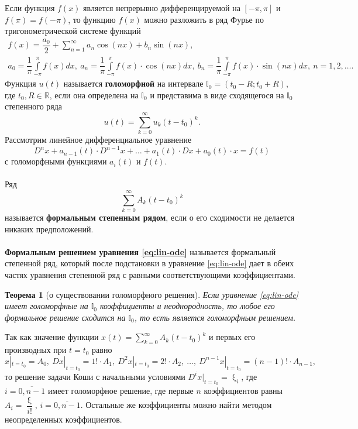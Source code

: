 \documentclass[a4paper, 12pt]{report}
\numberwithin{equation}{section}
\renewcommand{\xi}{\upxi}
\newtheorem*{theorem}{Теорема}
\begin{document}
	Если функция $f(x)$ является непрерывно дифференцируемой на $[-\pi, \pi]$ и $f(\pi) = f(-\pi)$, то функцию $f(x)$ можно разложить в ряд Фурье по тригонометрической системе функций
	\begin{equation*}
		\begin{gathered}
			f(x) = \dfrac{a_0}{2} + \sum_{n=1}^\infty a_n \cos (nx) + b_n \sin (nx),\\
			a_0 = \dfrac 1 \pi \int\limits_{-\pi}^\pi f(x)dx,\ a_n = \dfrac 1 \pi \int\limits_{-\pi}^\pi f(x)\cdot \cos(nx)dx,\ b_n = \dfrac 1 \pi \int\limits_{-\pi}^\pi f(x)\cdot \sin(nx)dx,\ n=1,2,\ldots.
		\end{gathered}
	\end{equation*}
	Функция $u(t)$ называется \textbf{голоморфной} на интервале $\mathbb I_0 = (t_0 - R; t_0 + R)$, где $t_0, R \in \mathbb R$, если она определена на $\mathbb I_0$ и представима в виде сходящегося на $\mathbb I_0$ степенного ряда $$u(t) = \sum\limits_{k=0}^\infty u_k (t-t_0)^k.$$ 
	Рассмотрим линейное дифференциальное уравнение 
	\begin{equation}
		\label{eq:lin-ode}
		D^nx + a_{n-1}(t)\cdot D^{n-1}x + \ldots + a_1(t)\cdot Dx + a_0(t)\cdot x = f(t)
	\end{equation} с голоморфными функциями $a_i(t)$ и $f(t)$.\\\\
	Ряд $$\sum_{k=0}^\infty A_k(t-t_0)^k$$ называется \textbf{формальным степенным рядом}, если о его сходимости не делается никаких предположений.\\\\
	\textbf{Формальным решением уравнения \eqref{eq:lin-ode}} называется формальный степенной ряд, который после подстановки в уравнение \eqref{eq:lin-ode} дает в обеих частях уравнения степенной ряд с равными соответствующими коэффициентами.
	\begin{theorem}
		[о существовании голоморфного решения] 
		Если уравнение \eqref{eq:lin-ode} имеет голоморфные на $\mathbb I_0$ коэффициенты и неоднородность, то любое его формальное решение сходится на $\mathbb I_0$, то есть является голоморфным решением.
	\end{theorem}
	\noindent
	Так как значение функции $x(t) = \sum_{k=0}^\infty A_k (t-t_0)^k$ и первых его производных при $t = t_0$ равно $$x|_{t=t_0} = A_0,\ Dx|_{t=t_0} = 1!\cdot A_1,\ D^2x|_{t=t_0} = 2!\cdot  A_2,\ \ldots,\ D^{n-1}x|_{t=t_0} = (n-1)!\cdot A_{n-1},$$ то решение задачи Коши с начальными условиями $D^ix|_{t=t_0} = \xi_i$, где $i = \overline{0,n-1}$ имеет голоморфное решение, где первые $n$ коэффициентов равны $A_i = \dfrac{\xi}{i!}$, $i=\overline{0, n-1}$. Остальные же коэффициенты можно найти методом неопределенных коэффициентов.
\end{document}
